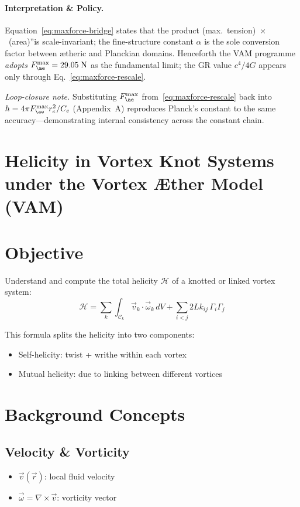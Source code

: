 \paragraph{Interpretation \& Policy.} Equation~\eqref{eq:maxforce-bridge} states that the product \grqq(max.~tension)~$\times$~(area)\textquotedblright is scale-invariant; the fine-structure constant \(\alpha\) is the sole conversion factor between ætheric and Planckian domains.  Henceforth the VAM programme \emph{adopts} \(F_{\ae}^{\max}=29.05\;\mathrm{N}\) as the fundamental limit; the GR value \(c^{4}/4G\) appears only through Eq.~\eqref{eq:maxforce-rescale}.

\smallskip
\noindent\emph{Loop-closure note.}  Substituting \(F_{\ae}^{\max}\) from~\eqref{eq:maxforce-rescale} back into \(h=4\pi F_{\ae}^{\max}r_{c}^{2}/C_{e}\) (Appendix~A) reproduces    Planck's constant to the same accuracy—demonstrating internal consistency across the constant chain.


\section{Helicity in Vortex Knot Systems under the Vortex Æther Model (VAM)}\label{sec:calculate-knot-helicity}

\section*{Objective}
Understand and compute the total helicity $\mathcal{H}$ of a knotted or linked vortex system:
\begin{equation}
    \boxed{
        \mathcal{H} = \sum_{k} \int_{\mathcal{C}_k} \vec{v}_k \cdot \vec{\omega}_k \, dV + \sum_{i<j} 2Lk_{ij} \, \Gamma_i \Gamma_j
    }
\end{equation}

This formula splits the helicity into two components:
\begin{itemize}
    \item Self-helicity: twist + writhe within each vortex
    \item Mutual helicity: due to linking between different vortices
\end{itemize}

\section{ Background Concepts}
\subsection{ Velocity \& Vorticity}
\begin{itemize}
    \item $\vec{v}(\vec{r})$: local fluid velocity
    \item $\vec{\omega} = \nabla \times \vec{v}$: vorticity vector
\end{itemize}

